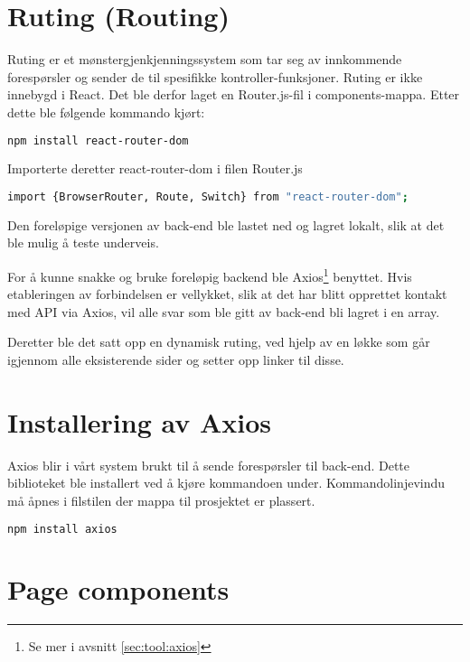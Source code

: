 \section{Ruting (Routing)}
Ruting er et mønstergjenkjenningssystem som tar seg av innkommende forespørsler og sender de til spesifikke kontroller-funksjoner. Ruting er ikke innebygd i React. Det ble derfor laget en Router.js-fil i components-mappa. Etter dette ble følgende kommando kjørt:

\begin{lstlisting}[caption={Installering av React ruting},language=bash]
npm install react-router-dom
\end{lstlisting}

Importerte deretter react-router-dom i filen Router.js

\begin{lstlisting}[caption={Importering av react-router-dom},language=bash]
import {BrowserRouter, Route, Switch} from "react-router-dom";
\end{lstlisting}

Den foreløpige versjonen av back-end ble lastet ned og lagret lokalt, slik at det ble mulig å teste underveis.

For å kunne snakke og bruke foreløpig backend ble Axios\footnote{Se mer i avsnitt \ref{sec:tool:axios}} benyttet. Hvis etableringen av forbindelsen er vellykket, slik at det har blitt opprettet kontakt med API via Axios, vil alle svar som ble gitt av back-end bli lagret i en array. 

Deretter ble det satt opp en dynamisk ruting, ved hjelp av en løkke som går igjennom alle eksisterende sider og setter opp linker til disse.

\section{Installering av Axios}
Axios blir i vårt system brukt til å sende forespørsler til back-end. Dette biblioteket ble installert ved å kjøre kommandoen under.  Kommandolinjevindu må åpnes i filstilen der mappa til prosjektet er plassert.
\begin{lstlisting}[caption={Installering av Axios},language=bash]
npm install axios
\end{lstlisting}


\section{Page components}

